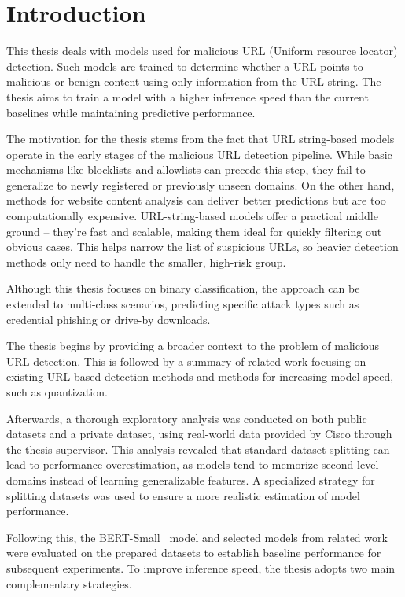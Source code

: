 \chapter*{Introduction}
This thesis deals with models used for malicious URL (Uniform resource locator) detection. Such models are trained to determine whether a URL points to malicious or benign content using only information from the URL string. The thesis aims to train a model with a higher inference speed than the current baselines while maintaining predictive performance.

The motivation for the thesis stems from the fact that URL string-based models operate in the early stages of the malicious URL detection pipeline. While basic mechanisms like blocklists and allowlists can precede this step, they fail to generalize to newly registered or previously unseen domains. On the other hand, methods for website content analysis can deliver better predictions but are too computationally expensive. URL-string-based models offer a practical middle ground -- they're fast and scalable, making them ideal for quickly filtering out obvious cases. This helps narrow the list of suspicious URLs, so heavier detection methods only need to handle the smaller, high-risk group.

Although this thesis focuses on binary classification, the approach can be extended to multi-class scenarios, predicting specific attack types such as credential phishing or drive-by downloads.

The thesis begins by providing a broader context to the problem of malicious URL detection. This is followed by a summary of related work focusing on existing URL-based detection methods and methods for increasing model speed, such as quantization.

Afterwards, a thorough exploratory analysis was conducted on both public datasets and a private dataset, using real-world data provided by Cisco through the thesis supervisor. This analysis revealed that standard dataset splitting can lead to performance overestimation, as models tend to memorize second-level domains instead of learning generalizable features. A specialized strategy for splitting datasets was used to ensure a more realistic estimation of model performance.

Following this, the BERT-Small~\cite{turc2019} model and selected models from related work were evaluated on the prepared datasets to establish baseline performance for subsequent experiments. To improve inference speed, the thesis adopts two main complementary strategies.

